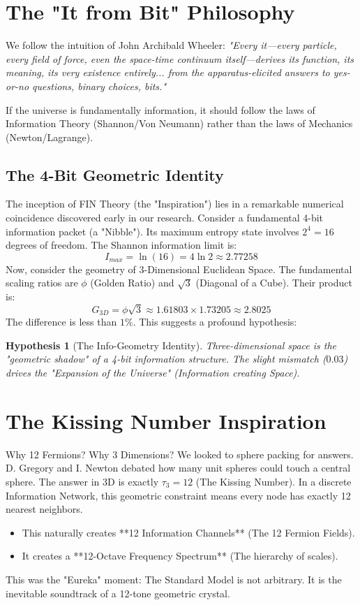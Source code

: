 \documentclass[11pt, a4paper]{report}
\newtheorem{hypothesis}{Hypothesis}[chapter]
\begin{document}
\section{The "It from Bit" Philosophy}
We follow the intuition of John Archibald Wheeler: \textit{"Every it—every particle, every field of force, even the space-time continuum itself—derives its function, its meaning, its very existence entirely... from the apparatus-elicited answers to yes-or-no questions, binary choices, bits."}

If the universe is fundamentally information, it should follow the laws of Information Theory (Shannon/Von Neumann) rather than the laws of Mechanics (Newton/Lagrange).

\subsection{The 4-Bit Geometric Identity}
The inception of FIN Theory (the "Inspiration") lies in a remarkable numerical coincidence discovered early in our research. 
Consider a fundamental 4-bit information packet (a "Nibble"). Its maximum entropy state involves $2^4 = 16$ degrees of freedom. The Shannon information limit is:
\begin{equation}
    I_{max} = \ln(16) = 4 \ln 2 \approx 2.77258
\end{equation}
Now, consider the geometry of 3-Dimensional Euclidean Space. The fundamental scaling ratios are $\phi$ (Golden Ratio) and $\sqrt{3}$ (Diagonal of a Cube). Their product is:
\begin{equation}
    G_{3D} = \phi \sqrt{3} \approx 1.61803 \times 1.73205 \approx 2.8025
\end{equation}
The difference is less than $1\%$. This suggests a profound hypothesis:
\begin{hypothesis}[The Info-Geometry Identity]
Three-dimensional space is the "geometric shadow" of a 4-bit information structure. The slight mismatch ($0.03$) drives the "Expansion of the Universe" (Information creating Space).
\end{hypothesis}

\section{The Kissing Number Inspiration}
Why 12 Fermions? Why 3 Dimensions?
We looked to sphere packing for answers. D. Gregory and I. Newton debated how many unit spheres could touch a central sphere. The answer in 3D is exactly $\tau_3 = 12$ (The Kissing Number).
In a discrete Information Network, this geometric constraint means every node has exactly 12 nearest neighbors.
\begin{itemize}
    \item This naturally creates **12 Information Channels** (The 12 Fermion Fields).
    \item It creates a **12-Octave Frequency Spectrum** (The hierarchy of scales).
\end{itemize}
This was the "Eureka" moment: The Standard Model is not arbitrary. It is the inevitable soundtrack of a 12-tone geometric crystal.
\end{document}
